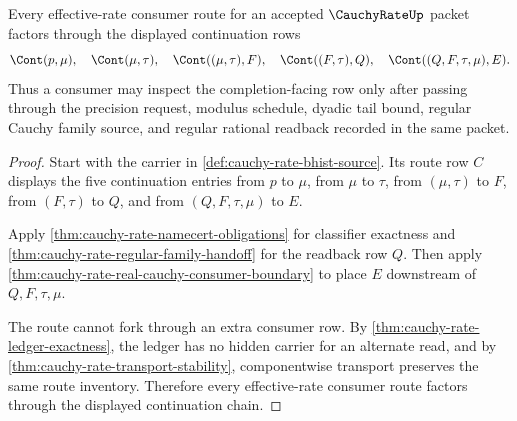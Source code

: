 \begin{theorem}
\label{thm:cauchy-rate-effective-route-scope}
Every effective-rate consumer route for an accepted $\CauchyRateUp$ packet factors through the displayed continuation rows
$$
\Cont(p,\mu),\quad \Cont(\mu,\tau),\quad \Cont((\mu,\tau),F),\quad
\Cont((F,\tau),Q),\quad \Cont((Q,F,\tau,\mu),E).
$$
Thus a consumer may inspect the completion-facing row only after passing through the precision request, modulus schedule, dyadic tail bound, regular Cauchy family source, and regular rational readback recorded in the same packet.
\end{theorem}
\begin{proof}
Start with the carrier in \autoref{def:cauchy-rate-bhist-source}. Its route row $C$ displays the five continuation entries from $p$ to $\mu$, from $\mu$ to $\tau$, from $(\mu,\tau)$ to $F$, from $(F,\tau)$ to $Q$, and from $(Q,F,\tau,\mu)$ to $E$.

Apply \autoref{thm:cauchy-rate-namecert-obligations} for classifier exactness and \autoref{thm:cauchy-rate-regular-family-handoff} for the readback row $Q$. Then apply \autoref{thm:cauchy-rate-real-cauchy-consumer-boundary} to place $E$ downstream of $Q,F,\tau,\mu$.

The route cannot fork through an extra consumer row. By \autoref{thm:cauchy-rate-ledger-exactness}, the ledger has no hidden carrier for an alternate read, and by \autoref{thm:cauchy-rate-transport-stability}, componentwise transport preserves the same route inventory. Therefore every effective-rate consumer route factors through the displayed continuation chain.
\end{proof}

